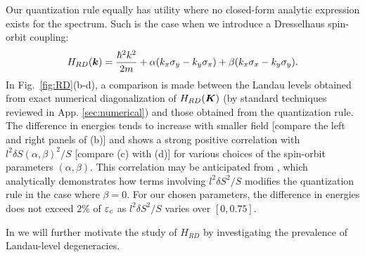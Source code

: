 \documentclass[aps, prb, showpacs, twocolumn, notitlepage, superscriptaddress]{revtex4-1}
\begin{document}
Our quantization rule equally has utility where no closed-form analytic expression exists for the spectrum. Such is the case when we introduce a Dresselhaus spin-orbit coupling:
\begin{equation}
 H_{RD}(\boldsymbol{k})=\frac{{\hbar^2}k^2}{2m}+\alpha(k_{x}\sigma_{y}-k_{y}\sigma_{x})+\beta(k_{x}\sigma_{x}-k_{y}\sigma_{y}).\label{hamRD}
\end{equation}
In Fig.\ \ref{fig:RD}(b-d), a comparison is made between the Landau levels obtained from exact numerical diagonalization of $H_{RD}(\boldsymbol{K})$ (by standard techniques reviewed in App. \ref{sec:numerical}) and those obtained from the quantization rule. The difference in energies tends to increase with smaller field [compare the left and right panels of   (b)] and shows a strong positive correlation with $l^2\delta S(\alpha,\beta)^2/S$ [compare (c) with (d)] for various choices of the spin-orbit parameters $(\alpha,\beta)$. This correlation may be anticipated from , which analytically demonstrates how terms involving $l^2\delta S^2/S$ modifies the quantization rule in the case where $\beta{=}0$. For our chosen parameters,  the difference in energies does not exceed $2\%$ of $\varepsilon_c$ as $l^2\delta S^2/S$ varies over $[0,0.75]$.



In  we will further motivate the study of $H_{RD}$ by investigating the prevalence of Landau-level degeneracies. 



\end{document}
